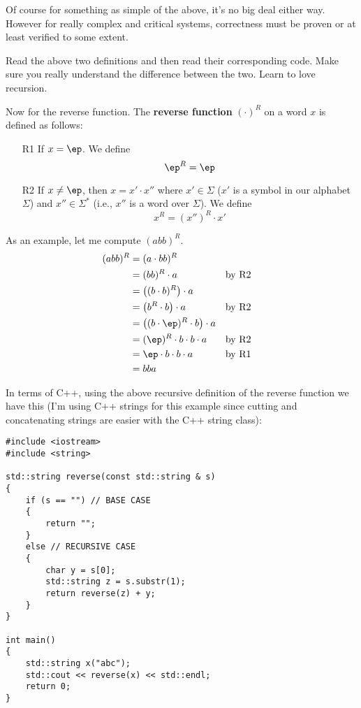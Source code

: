 Of course for something as simple of the above, it's no big deal either way.
However for really complex and critical systems, correctness must be
proven or at least verified to some extent.

Read the above two definitions and then read their corresponding code.
Make sure you really understand the difference between the two.
Learn to love recursion.

\newpage
Now for the reverse function. 
The {\bf reverse function} 
$(\cdot)^R$ on a word $x$ is defined as follows:
\begin{enumerate}
\item[R1] If $x = \ep$. We define
\[
\ep^R = \ep
\]
\item[R2] If $x \neq \ep$, then $x = x'\cdot x''$ where
$x' \in \Sigma$ ($x'$ is a symbol in our alphabet $\Sigma$) 
and $x'' \in \Sigma^*$ (i.e., $x''$ is a word over $\Sigma$). 
We define
\[
x^R = (x'')^R \cdot x'
\]
\end{enumerate}
As an example, let me compute $(abb)^R$.
\begin{align*}
(abb)^R
&= (a \cdot bb)^R                                   \\
&= (bb)^R \cdot a                  & & \text{by R2} \\
&= \left( (b\cdot b)^R \right) \cdot a & &              \\
&= \left( b^R \cdot b \right) \cdot a             & & \text{by R2} \\
&= \left( (b\cdot \ep)^R \cdot b \right) \cdot a  & &              \\
&= (\ep)^R \cdot b \cdot b \cdot a & & \text{by R2} \\
&= \ep \cdot b \cdot b \cdot a     & & \text{by R1} \\
&= bba                                              \\
\end{align*}

In terms of C++, using the above recursive definition of the
reverse function we have this (I'm using C++ strings for this example
since cutting and concatenating strings are easier with the C++ string
class):

\begin{Verbatim}[frame=single]
#include <iostream>
#include <string>

std::string reverse(const std::string & s)
{
    if (s == "") // BASE CASE
    {
        return "";
    }
    else // RECURSIVE CASE
    {
        char y = s[0];
        std::string z = s.substr(1);
        return reverse(z) + y;
    }
}

int main()
{
    std::string x("abc");
    std::cout << reverse(x) << std::endl;    
    return 0;
}
\end{Verbatim}

